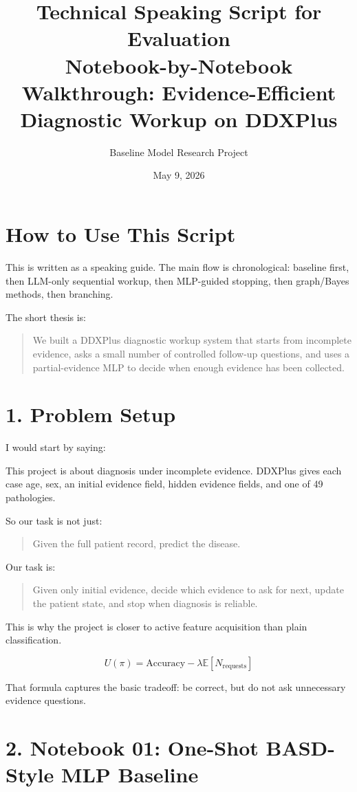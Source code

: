 \documentclass[11pt]{article}
\title{\textbf{Technical Speaking Script for Evaluation}\\
\large Notebook-by-Notebook Walkthrough: Evidence-Efficient Diagnostic Workup on DDXPlus}
\author{Baseline Model Research Project}
\date{May 9, 2026}
\begin{document}
\maketitle

\section*{How to Use This Script}

This is written as a speaking guide. The main flow is chronological: baseline first, then LLM-only sequential workup, then MLP-guided stopping, then graph/Bayes methods, then branching.

The short thesis is:

\begin{quote}
We built a DDXPlus diagnostic workup system that starts from incomplete evidence, asks a small number of controlled follow-up questions, and uses a partial-evidence MLP to decide when enough evidence has been collected.
\end{quote}

\section*{1. Problem Setup}

I would start by saying:

This project is about diagnosis under incomplete evidence. DDXPlus gives each case age, sex, an initial evidence field, hidden evidence fields, and one of 49 pathologies.

So our task is not just:

\begin{quote}
Given the full patient record, predict the disease.
\end{quote}

Our task is:

\begin{quote}
Given only initial evidence, decide which evidence to ask for next, update the patient state, and stop when diagnosis is reliable.
\end{quote}

This is why the project is closer to active feature acquisition than plain classification.

\[
U(\pi)=\text{Accuracy}-\lambda \mathbb{E}[N_{\text{requests}}]
\]

That formula captures the basic tradeoff: be correct, but do not ask unnecessary evidence questions.

\section*{2. Notebook 01: One-Shot BASD-Style MLP Baseline}
\end{document}
